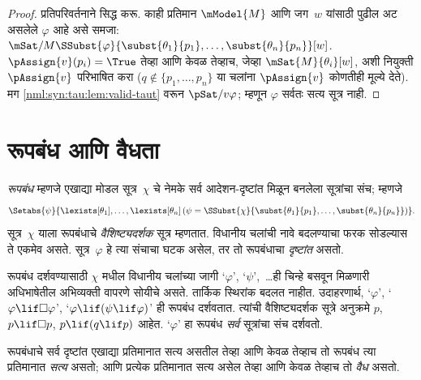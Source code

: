\begin{proof}
  प्रतिपरिवर्तनाने सिद्ध करू. काही प्रतिमान $\mModel{M}$ आणि जग~$w$
  यांसाठी पुढील अट असलेले $\varphi$ आहे असे समजा:
  $\mSat/{M}{\SSubst{\varphi}{\subst{\theta_1}{p_1}, \dots,
  \subst{\theta_n}{p_n}}}[w]$.
  $\pAssign{v}(p_i) = \True$ तेव्हा आणि केवळ तेव्हाच,
  जेव्हा $\mSat{M}{\theta_i}[w]$, अशी नियुक्ती $\pAssign{v}$
  परिभाषित करा ($q \notin \{p_1, \dots, p_n \}$ या
  चलांना $\pAssign{v}$ कोणतीही मूल्ये देते). मग
  \ref{nml:syn:tau:lem:valid-taut} वरून $\pSat/{v}{\varphi}$; म्हणून
  $\varphi$ सर्वतः सत्य सूत्र नाही.
\end{proof}













\section{रूपबंध आणि वैधता}\label{nml:syn:sch:sec}

\begin{defn}
  \emph{रूपबंध} म्हणजे एखाद्या मोडल सूत्र~$\chi$ चे
  नेमके सर्व आदेशन-दृष्टांत मिळून बनलेला सूत्रांचा संच; म्हणजे
  \[  \Setabs{\psi}{\lexists[\theta_1], \dots, \lexists[\theta_n] \left(\psi =
  \SSubst{\chi}{\subst{\theta_1}{p_1}, \dots, \subst{\theta_n}{p_n}} \right) }.
  \]
  सूत्र~$\chi$ याला रूपबंधाचे \emph{वैशिष्ट्यदर्शक} सूत्र
  म्हणतात. विधानीय चलांची नावे बदलण्याचा फरक सोडल्यास ते एकमेव असते.
  सूत्र~$\varphi$ हे त्या संचाचा घटक असेल, तर तो
  रूपबंधाचा \emph{दृष्टांत} असतो.
\end{defn}

रूपबंध दर्शवण्यासाठी $\chi$ मधील विधानीय चलांच्या जागी
`$\varphi$', `$\psi$',~\dots ही चिन्हे बसवून मिळणारी
अधिभाषेतील अभिव्यक्ती वापरणे सोयीचे असते. तार्किक स्थिरांक बदलत नाहीत. उदाहरणार्थ,
`$\varphi$', `$\varphi \lif \Box\varphi$', `$\varphi \lif (\psi \lif \varphi)$'
ही रूपबंध दर्शवतात. त्यांची वैशिष्ट्यदर्शक सूत्रे
अनुक्रमे $p$, $p \lif \Box p$, $p \lif (q
\lif p)$ आहेत. `$\varphi$' हा रूपबंध \emph{सर्व}
सूत्रांचा संच दर्शवतो.

\begin{defn}
  रूपबंधाचे सर्व दृष्टांत एखाद्या प्रतिमानात सत्य असतील तेव्हा
  आणि केवळ तेव्हाच तो रूपबंध त्या प्रतिमानात \emph{सत्य}
  असतो; आणि प्रत्येक प्रतिमानात सत्य असेल तेव्हा आणि केवळ
  तेव्हाच तो \emph{वैध} असतो.
\end{defn}

